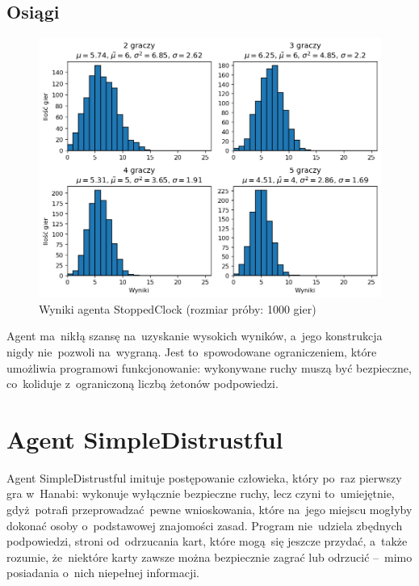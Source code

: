 \documentclass[declaration,shortabstract,inz]{iithesis}
\begin{document}
\subsection*{Osiągi}

\begin{figure}[H]
	\centering
	\captionsetup{format=hang}
	\includegraphics[width=\textwidth,height=\textheight,keepaspectratio]{StoppedClock.png}
	\caption[Caption]{Wyniki agenta StoppedClock (rozmiar próby: 1000 gier)}
	\label{fig:StoppedClock}
\end{figure}

Agent ma~nikłą szansę na~uzyskanie wysokich wyników, a~jego konstrukcja nigdy nie~pozwoli na~wygraną. Jest to~spowodowane ograniczeniem, które umożliwia programowi funkcjonowanie: wykonywane ruchy muszą być bezpieczne, co~koliduje z~ograniczoną liczbą żetonów podpowiedzi.

\section{Agent SimpleDistrustful}

Agent SimpleDistrustful imituje postępowanie człowieka, który po~raz pierwszy gra w~Hanabi: wykonuje wyłącznie bezpieczne ruchy, lecz czyni to~umiejętnie, gdyż~potrafi przeprowadzać pewne wnioskowania, które na~jego miejscu mogłyby dokonać osoby o~podstawowej znajomości zasad. Program nie~udziela zbędnych podpowiedzi, stroni od~odrzucania kart, które mogą~się jeszcze przydać, a~także rozumie, że~niektóre karty zawsze można bezpiecznie zagrać lub odrzucić --~mimo posiadania o~nich niepełnej informacji.
\end{document}
